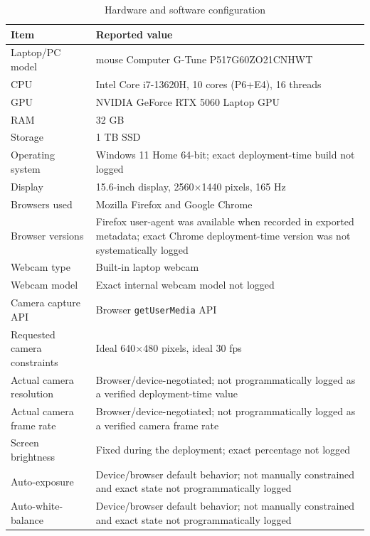 \documentclass[dvipdfmx]{ehis}
\begin{document}
\begin{table}[t]
\caption{Hardware and software configuration}
\label{tab:hardware_config}
\begin{center}
\small
\begin{tabular}{p{}p{}}
\toprule
\textbf{Item} & \textbf{Reported value} \\
\midrule
Laptop/PC model & mouse Computer G-Tune P517G60ZO21CNHWT \\
CPU & Intel Core i7-13620H, 10 cores (P6+E4), 16 threads \\
GPU & NVIDIA GeForce RTX 5060 Laptop GPU \\
RAM & 32 GB \\
Storage & 1 TB SSD \\
Operating system & Windows 11 Home 64-bit; exact deployment-time build not logged \\
Display & 15.6-inch display, 2560$\times$1440 pixels, 165 Hz \\
Browsers used & Mozilla Firefox and Google Chrome \\
Browser versions & Firefox user-agent was available when recorded in exported metadata; exact Chrome deployment-time version was not systematically logged \\
Webcam type & Built-in laptop webcam \\
Webcam model & Exact internal webcam model not logged \\
Camera capture API & Browser \texttt{getUserMedia} API \\
Requested camera constraints & Ideal 640$\times$480 pixels, ideal 30 fps \\
Actual camera resolution & Browser/device-negotiated; not programmatically logged as a verified deployment-time value \\
Actual camera frame rate & Browser/device-negotiated; not programmatically logged as a verified camera frame rate \\
Screen brightness & Fixed during the deployment; exact percentage not logged \\
Auto-exposure & Device/browser default behavior; not manually constrained and exact state not programmatically logged \\
Auto-white-balance & Device/browser default behavior; not manually constrained and exact state not programmatically logged \\
\bottomrule
\end{tabular}
\end{center}
\end{table}
\end{document}
